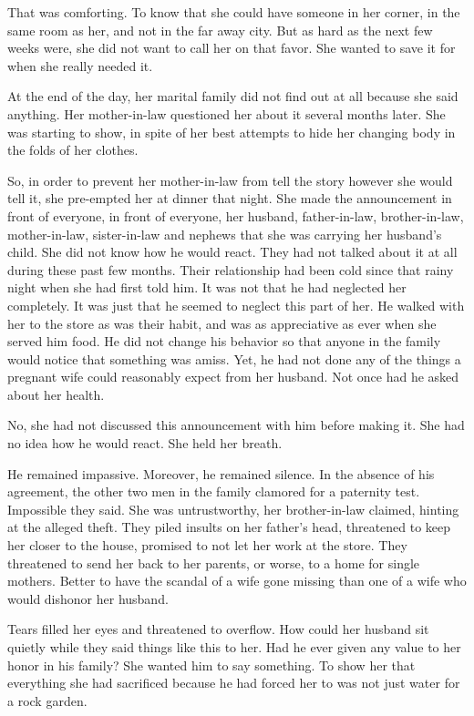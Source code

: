 \documentclass{article}
\begin{document}
That was comforting. To know that she could have someone in her corner, in the same room as her, and not in the far away city. But as hard as the next few weeks were, she did not want to call her on that favor. She wanted to save it for when she really needed it.

At the end of the day, her marital family did not find out at all because she said anything. Her mother-in-law questioned her about it several months later. She was starting to show, in spite of her best attempts to hide her changing body in the folds of her clothes. 

So, in order to prevent her mother-in-law from tell the story however she would tell it, she pre-empted her at dinner that night. She made the announcement in front of everyone, in front of everyone, her husband, father-in-law, brother-in-law, mother-in-law, sister-in-law and nephews that she was carrying her husband's child. She did not know how he would react. They had not talked about it at all during these past few months. Their relationship had been cold since that rainy night when she had first told him. It was not that he had neglected her completely. It was just that he seemed to neglect this part of her. He walked with her to the store as was their habit, and was as appreciative as ever when she served him food. He did not change his behavior so that anyone in the family would notice that something was amiss. Yet, he had not done any of the things a pregnant wife could reasonably expect from her husband. Not once had he asked about her health. 

No, she had not discussed this announcement with him before making it. She had no idea how he would react. She held her breath.

He remained impassive. Moreover, he remained silence. In the absence of his agreement, the other two men in the family clamored for a paternity test. Impossible they said. She was untrustworthy, her brother-in-law claimed, hinting at the alleged theft. They piled insults on her father's head, threatened to keep her closer to the house, promised to not let her work at the store. They threatened to send her back to her parents, or worse, to a home for single mothers. Better to have the scandal of a wife gone missing than one of a wife who would dishonor her husband. 

Tears filled her eyes and threatened to overflow. How could her husband sit quietly while they said things like this to her. Had he ever given any value to her honor in his family? She wanted him to say something. To show her that everything she had sacrificed because he had forced her to was not just water for a rock garden. 
\end{document}
